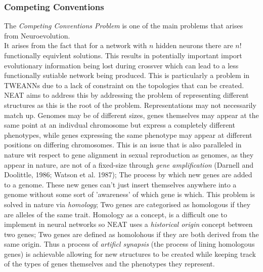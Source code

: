 \documentclass{article}
\begin{document}
\subsubsection*{Competing Conventions}
The \emph{Competing Conventions Problem} is one of the main problems that arises from Neuroevolution.\\
It arises from the fact that for a network with $n$ hidden neurons there are $n!$ functionally equivlent solutions. 
This results in potentially important import evolutionary information being lost during crossver which can lead to a less functionally sutiable network being produced.
This is particularly a problem in TWEANNs due to a lack of constraint on the topologies that can be created.
NEAT aims to address this by addressing the problem of representing different structures as this is the root of the problem.
Representations may not necessarily match up. Genomes may be of different sizes, genes themselves may appear at the same point at an indivdual chromosome but express
a completely different phenotypes, while genes expressing the same phenotype may appear at different positions on differing chromosomes.
This is an issue that is also paralleled in nature wit respect to gene alignment in sexual reproduction as genomes, as they appear in nature, are not of a fixed-size
through \emph{gene amplification} (Darnell and Doolittle, 1986; Watson et al. 1987); The process by which new genes are added to a genome.
These new genes can't just insert themselves anywhere into a genome without some sort of 'awareness' of which gene is which.
This problem is solved in nature via \emph{homology}; Two genes are categorised as homologous if they are alleles of the same trait.
Homology as a concept, is a difficult one to implement in neural networks so NEAT uses a \emph{historical origin} concept between two genes;
Two genes are defined as homolohous if they are both derived from the same origin. Thus a process of \emph{artificl synapsis} (the process of lining homologous genes)
is achievable allowing for new structures to be created while keeping track of the types of genes themselves and the phenotypes they represent.
\end{document}
